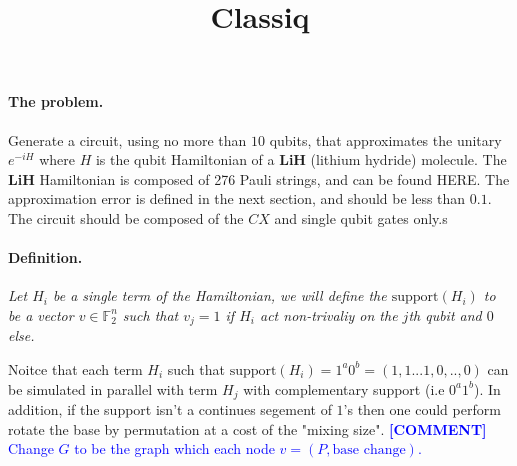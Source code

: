 \documentclass{article}
\newcommand{\commentt}[1]{\textcolor{blue}{ \textbf{[COMMENT]} #1}}
\newcommand{\ctt}[1]{\commentt{#1}}
\newcommand{\PSI}{{\ket{\psi}}}
\begin{document}
    
\title{Classiq}
    
\maketitle
\begin{multicols*}{2}


\paragraph{The problem.} Generate a circuit, using no more than \(10\) qubits, that approximates the unitary \(e^{-iH}\) where \(H\) is the qubit Hamiltonian of a \textbf{LiH} (lithium hydride) molecule. The \textbf{LiH} Hamiltonian is composed of 276 Pauli strings, and can be found HERE. The approximation error is defined in the next section, and should be less than \(0.1\). The circuit should be composed of the \(CX\) and single qubit gates only.s


\paragraph{Definition.} \textit{ Let \(H_{i}\) be a single term of the Hamiltonian, we will define the \( \text{support}(H_{i}) \) to be a vector \( v \in \mathbb{F}^{n}_2\) such that \(v_j = 1\) if \(H_{i}\) act non-trivaliy on the \(j\)th qubit and \(0\) else.}

Noitce that each term \(H_i\) such that \(\text{support}(H_{i}) = 1^{a}0^{b} = (1,1...1,0,..,0)\) can be simulated in parallel with term \(H_j\) with complementary support (i.e \(0^{a}1^{b}\)).  
In addition, if the support isn't a continues segement of \(1\)'s then one could perform rotate the base by permutation at a cost of the "mixing size".   
\ctt{Change \(G\) to be the graph which each node \( v = \left(P, \text{base change}\right) \). }


\end{multicols*}
\end{document}
